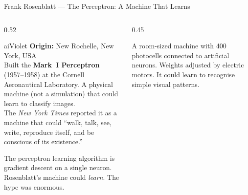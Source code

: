 \begin{frame}[shrink=9]{Frank Rosenblatt --- The Perceptron: A Machine That Learns}

  \begin{columns}[T]
    \begin{column}{0.52\textwidth}
      \begin{personbox}{aiViolet}
        \textbf{Origin:} New Rochelle, New York, USA\\[3pt]
        Built the \textbf{Mark~I Perceptron} (1957--1958) at the
        Cornell Aeronautical Laboratory. A physical machine (not a
        simulation) that could learn to classify images.\\[3pt]
        The \emph{New York Times} reported it as a machine that could
        ``walk, talk, see, write, reproduce itself, and be conscious
        of its existence.''
      \end{personbox}

      \vspace{0.3em}
      \begin{insightbox}
        The perceptron learning algorithm is gradient descent
        on a single neuron. Rosenblatt's machine could \emph{learn}.
        The hype was enormous.
      \end{insightbox}
    \end{column}

    \begin{column}{0.45\textwidth}
      \begin{tcolorbox}[colback=neuronPink!5,colframe=neuronPink!60,
        fonttitle=\bfseries\small,title={Mark~I Perceptron (1958)},
        rounded corners,boxrule=0.8pt,left=3pt,right=3pt,top=3pt,bottom=3pt]
        \scriptsize
        A room-sized machine with 400 photocells connected
        to artificial neurons. Weights adjusted by electric motors.
        It could learn to recognise simple visual patterns.
      \end{tcolorbox}
      \vspace{0.3em}
    \end{column}
  \end{columns}


\end{frame}
